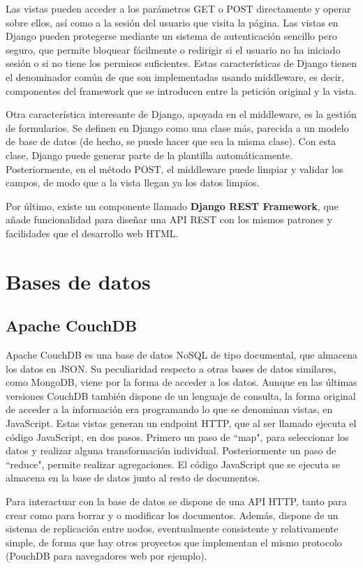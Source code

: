 \documentclass[openright,twoside,12pt]{book}
\begin{document}
Las vistas pueden acceder a los parámetros GET o POST directamente y operar sobre ellos, así como a la sesión del usuario que visita la página.
Las vistas en Django pueden protegerse mediante un sistema de autenticación sencillo pero seguro, que permite bloquear fácilmente o redirigir si el usuario no ha iniciado sesión o si no tiene los permisos suficientes.
Estas características de Django tienen el denominador común de que son implementadas usando middleware, es decir, componentes del framework que se introducen entre la petición original
y la vista.

Otra característica interesante de Django, apoyada en el middleware, es la gestión de formularios. Se definen en Django como una clase más, parecida a un modelo de base de datos (de hecho, se puede hacer que sea la misma clase).
Con esta clase, Django puede generar parte de la plantilla automáticamente. Posteriormente, en el método POST, el middleware puede limpiar y validar los campos, de modo que a la vista llegan ya los datos limpios.

Por último, existe un componente llamado \textbf{Django REST Framework}, que añade funcionalidad para diseñar una API REST con los mismos patrones y facilidades que el desarrollo web HTML.

\section{Bases de datos}
\subsection{Apache CouchDB}
Apache CouchDB es una base de datos NoSQL de tipo documental, que almacena los datos en JSON\cite{couchdb}.
Su peculiaridad respecto a otras bases de datos similares, como MongoDB, viene por la forma de acceder a los datos.
Aunque en las últimas versiones CouchDB también dispone de un lenguaje de consulta, la forma original de acceder a la información era programando lo que se denominan vistas, en JavaScript.
Estas vistas generan un endpoint HTTP, que al ser llamado ejecuta el código JavaScript, en dos pasos. Primero un paso de ``map", para seleccionar los datos y realizar alguna transformación individual.
Posteriormente un paso de ``reduce", permite realizar agregaciones. El código JavaScript que se ejecuta se almacena en la base de datos junto al resto de documentos.

Para interactuar con la base de datos se dispone de una API HTTP, tanto para crear como para borrar y o modificar los documentos.
Además, dispone de un sistema de replicación entre nodos, eventualmente consistente y relativamente simple, de forma que hay otros proyectos que implementan el mismo protocolo (PouchDB para navegadores web por ejemplo).
\end{document}
